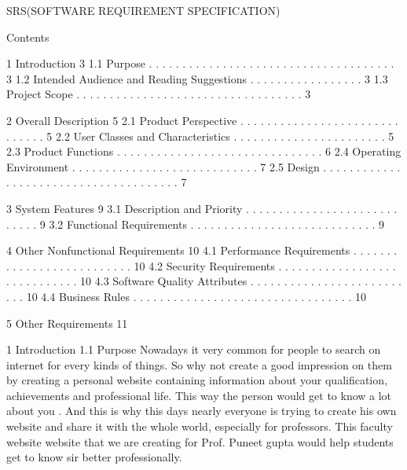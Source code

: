 											SRS(SOFTWARE REQUIREMENT SPECIFICATION)

Contents

1 Introduction                                                                      3
1.1 Purpose . . . . . . . . . . . . . . . . . . . . . . . . . . . . . . . . . . . . . 3
1.2 Intended Audience and Reading Suggestions . . . . . . . . . . . . . . . . . 3
1.3 Project Scope . . . . . . . . . . . . . . . . . . . . . . . . . . . . . . . . . . 3

2 Overall Description                                                               5
2.1 Product Perspective . . . . . . . . . . . . . . . . . . . . . . . . . . . . . . 5
2.2 User Classes and Characteristics . . . . . . . . . . . . . . . . . . . . . . . 5
2.3 Product Functions . . . . . . . . . . . . . . . . . . . . . . . . . . . . . . . 6
2.4 Operating Environment . . . . . . . . . . . . . . . . . . . . . . . . . . . . 7
2.5 Design . . . . . . . . . . . . . . . . . . . . . . . . . . . . . . . . . . . . . . 7

3 System Features                                                                   9
3.1 Description and Priority . . . . . . . . . . . . . . . . . . . . . . . . . . . . 9
3.2 Functional Requirements . . . . . . . . . . . . . . . . . . . . . . . . . . . . 9

4 Other Nonfunctional Requirements                                            10
4.1 Performance Requirements . . . . . . . . . . . . . . . . . . . . . . . . . . 10
4.2 Security Requirements . . . . . . . . . . . . . . . . . . . . . . . . . . . . . 10
4.3 Software Quality Attributes . . . . . . . . . . . . . . . . . . . . . . . . . . 10
4.4 Business Rules . . . . . . . . . . . . . . . . . . . . . . . . . . . . . . . . . 10

5 Other Requirements                                                              11

1 Introduction
1.1 Purpose
Nowadays it very common for people to search on internet for every kinds of things. So why not create a good impression on them by creating a personal website containing information about your qualification, achievements and professional life. This way the person would get to know a lot about you . And this is why this days nearly everyone is trying to create his own website and share it with the whole world, especially for professors. This faculty website website that we are creating for Prof. Puneet gupta would help students get to know sir better professionally.

